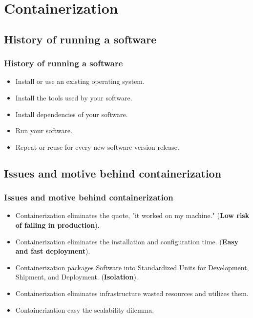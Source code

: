 \documentclass[t,28pt,aspectratio=169,usenames,dvipsnames]{beamer}
\begin{document}
\section{Containerization}

\subsection{History of running a software}
\begin{frame}
    \frametitle{History of running a software}
    \begin{itemize}
        \item Install or use an existing operating system.
        \item Install the tools used by your software.
        \item Install dependencies of your software.
        \item Run your software.
        \item Repeat or reuse for every new software version release.
    \end{itemize}
\end{frame}

\subsection{Issues and motive behind containerization}
\begin{frame}
    \frametitle{Issues and motive behind containerization}
    \begin{itemize}
        \item Containerization eliminates the quote, "it worked on my machine." (\textbf{Low risk of failing in production}).
        \item Containerization eliminates the installation and configuration time. (\textbf{Easy and fast deployment}).
        \item Containerization packages Software into Standardized Units for Development, Shipment, and Deployment. (\textbf{Isolation}).
        \item Containerization eliminates infrastructure wasted resources and utilizes them.
        \item Containerization easy the scalability dilemma.
    \end{itemize}
\end{frame}
\end{document}
